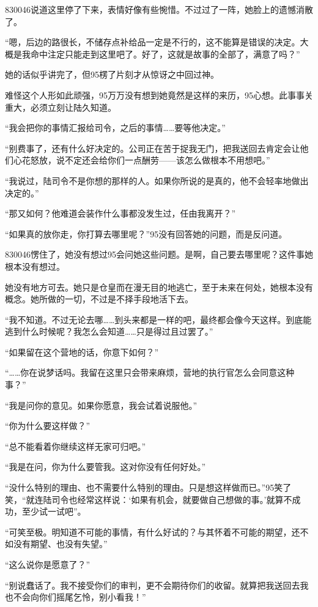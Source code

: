 830046说道这里停了下来，表情好像有些惋惜。不过过了一阵，她脸上的遗憾消散了。

“嗯，后边的路很长，不储存点补给品一定是不行的，这不能算是错误的决定。大概是我命中注定只能走到这里吧了。好了，这就是故事的全部了，满意了吗？”

她的话似乎讲完了，但95楞了片刻才从惊讶之中回过神。

难怪这个人形如此顽强，95万万没有想到她竟然是这样的来历，95心想。此事事关重大，必须立刻让陆久知道。

“我会把你的事情汇报给司令，之后的事情……要等他决定。”

“别费事了，还有什么好决定的。公司正在苦于捉我无门，把我送回去肯定会让他们心花怒放，说不定还会给你们一点酬劳——该怎么做根本不用想吧。”

“我说过，陆司令不是你想的那样的人。如果你所说的是真的，他不会轻率地做出决定的。”

“那又如何？他难道会装作什么事都没发生过，任由我离开？”

“如果真的放你走，你打算去哪里呢？”95没有回答她的问题，而是反问道。

830046愣住了，她没有想过95会问她这些问题。是啊，自己要去哪里呢？这件事她根本没有想过。

她没有地方可去。她只是仓皇而在漫无目的地逃亡，至于未来在何处，她根本没有概念。她所做的一切，不过是不择手段地活下去。

“我不知道。不过无论去哪……到头来都是一样的吧，最终都会像今天这样。到底能逃到什么时候呢？我怎么会知道……只是得过且过罢了。”

“如果留在这个营地的话，你意下如何？”

“……你在说梦话吗。我留在这里只会带来麻烦，营地的执行官怎么会同意这种事？”

“我是问你的意见。如果你愿意，我会试着说服他。”

“你为什么要这样做？”

“总不能看着你继续这样无家可归吧。”

“我是在问，你为什么要管我。这对你没有任何好处。”

“没什么特别的理由、也不需要什么特别的理由。只是想这样做而已。”95笑了笑，“就连陆司令也经常这样说：‘如果有机会，就要做自己想做的事。’就算不成功，至少试一试吧”。

“可笑至极。明知道不可能的事情，有什么好试的？与其怀着不可能的期望，还不如没有期望、也没有失望。”

“这么说你是愿意了？”

“别说蠢话了。我不接受你们的审判，更不会期待你们的收留。就算把我送回去我也不会向你们摇尾乞怜，别小看我！”

